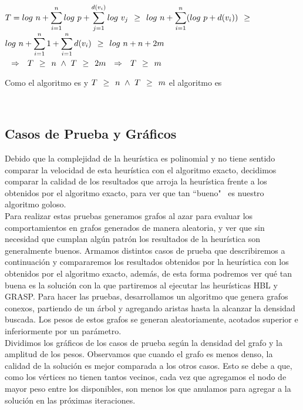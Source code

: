\documentclass[a4paper, 10pt]{article}
\begin{document}
\begin{center}
	\ensuremath{ T = log\ n + \zum{i=1}{n}{log\ p + \zum{j=1}{d(v_i)}{log\ v_j}} \mai log\ n + \zum{i=1}{n}{(log\ p + d(v_i))} \mai } \\
	\ensuremath{ log\ n + \zum{i=1}{n}{1} + \zum{i=1}{n}{d(v_i)} \mai log\ n + n + 2m} \\
	\vspace{1.5em}	
	\ensuremath{ \entonces T \mai n \ \wedge \ T \mai 2m \entonces T \mai m} \\
\end{center}

Como el algoritmo es  y $T \mai n \ \wedge \ T \mai m$ \entonces el algoritmo es  \pertenece {}

\newpage

­\subsection{Casos de Prueba y Gr\'aficos}

Debido que la complejidad de la heur\'istica es polinomial y no tiene sentido comparar la velocidad de esta heur\'istica con el algoritmo exacto, decidimos comparar la calidad de los resultados que arroja la heur\'istica frente a los obtenidos por el algoritmo exacto, para ver que tan ``bueno" \ es nuestro algoritmo goloso. \\

Para realizar estas pruebas generamos grafos al azar para evaluar los comportamientos en grafos generados de manera aleatoria, y ver que sin necesidad que cumplan alg\'un patr\'on los resultados de la heur\'istica son generalmente buenos. Armamos distintos casos de prueba que describiremos a continuaci\'on y compararemos los resultados obtenidos por la heur\'istica con los obtenidos por el algoritmo exacto, adem\'as, de esta forma podremos ver qu\'e tan buena es la soluci\'on con la que partiremos al ejecutar las heur\'isticas HBL y GRASP. Para hacer las pruebas, desarrollamos un algoritmo que genera grafos conexos, partiendo de un \'arbol y agregando aristas hasta la alcanzar la densidad buscada. Los pesos de estos grafos se generan aleatoriamente, acotados superior e inferiormente por un par\'ametro. \\

Dividimos los gr\'aficos de los casos de prueba seg\'un la densidad del grafo y la amplitud de los pesos. Observamos que cuando el grafo es menos denso, la calidad de la soluci\'on es mejor comparada a los otros casos. Esto se debe a que, como los v\'ertices no tienen tantos vecinos, cada vez que agregamos el nodo de mayor peso entre los disponibles, son menos los que anulamos para agregar a la soluci\'on en las pr\'oximas iteraciones. \\
\end{document}
